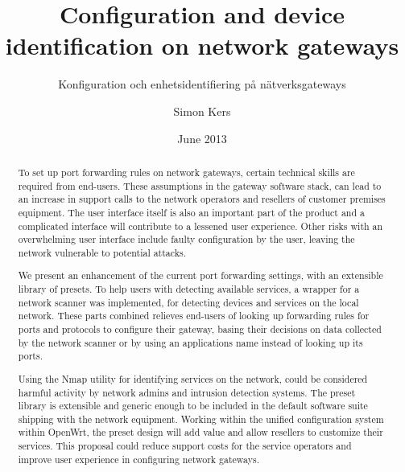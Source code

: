 \documentclass[a4paper,11pt,makeidx]{kth-bcs}
\date{June 2013}
\title{Configuration and device identification on network gateways}
\subtitle{Konfiguration och enhetsidentifiering på nätverksgateways}
\author{Simon Kers}
\newcommand\blankpage{%
    \null
    \thispagestyle{empty}%
    \addtocounter{page}{-1}%
    \newpage}
\begin{document}
\frontmatter
{}
\setcounter{page}{1}
\pagestyle{center}

\maketitle
\thispagestyle{center}
\begin{abstract}
To set up port forwarding rules on network gateways, certain technical skills are required from end-users.
These assumptions in the gateway software stack, can lead to an increase in support calls to the network operators and resellers of customer premises equipment.
The user interface itself is also an important part of the product and a complicated interface will contribute to a lessened user experience.
Other risks with an overwhelming user interface include faulty configuration by the user, leaving the network vulnerable to potential attacks.


We present an enhancement of the current port forwarding settings, with an extensible library of presets.
To help users with detecting available services, a wrapper for a network scanner was implemented, for detecting devices and services on the local network.
These parts combined relieves end-users of looking up forwarding rules for ports and protocols to configure their gateway, basing their decisions on data collected by the network scanner or by using an applications name instead of looking up its ports.

Using the Nmap utility for identifying services on the network, could be considered harmful activity by network admins and intrusion detection systems.
The preset library is extensible and generic enough to be included in the default software suite shipping with the network equipment.
Working within the unified configuration system within OpenWrt, the preset design will add value and allow resellers to customize their services.
This proposal could reduce support costs for the service operators and improve user experience in configuring network gateways.

\end{abstract}
\newpage
\blankpage
\end{document}
